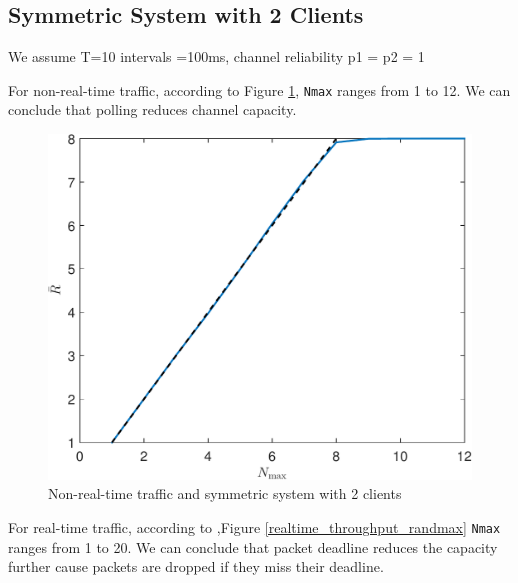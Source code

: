 \documentclass{article}
\begin{document}
\subsection{Symmetric System with 2 Clients}
We assume T=10 intervals =100ms, channel reliability p1 = p2 = 1

For non-real-time traffic, according to Figure \ref{nonrealtime_throughput_randmax}, \lstinline |Nmax| ranges from 1 to 12. We can conclude that polling reduces channel capacity. 

\begin{figure}[htbp]
\centering
\includegraphics[scale=0.5]{nonrealtime_throughput_randmax.pdf}
\caption{Non-real-time traffic and symmetric system with 2 clients}
\label{nonrealtime_throughput_randmax}
\end{figure}

For real-time traffic, according to ,Figure \ref{realtime_throughput_randmax} \lstinline |Nmax| ranges from 1 to 20. We can conclude that packet deadline reduces the capacity further cause packets are dropped if they miss their deadline. 
\end{document}
